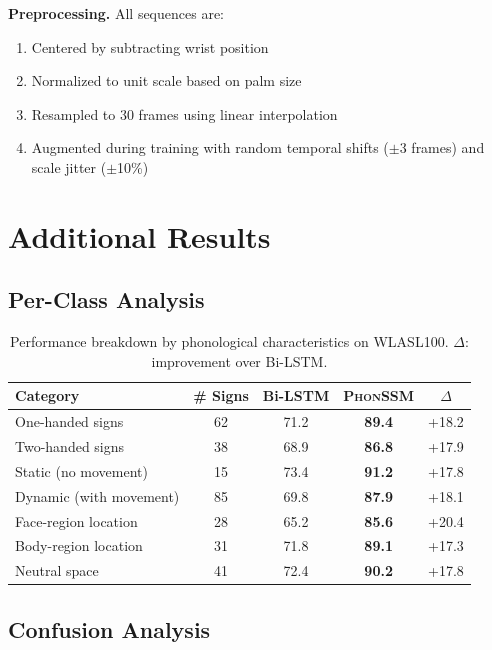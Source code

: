 \documentclass[sigconf,nonacm,anonymous]{acmart}
\theoremstyle{definition}
\theoremstyle{remark}
\newcommand{\phonssm}{\textsc{PhonSSM}}
\begin{document}
\textbf{Preprocessing.} All sequences are:
\begin{enumerate}[nosep,topsep=3pt,leftmargin=*]
\item Centered by subtracting wrist position
\item Normalized to unit scale based on palm size
\item Resampled to 30 frames using linear interpolation
\item Augmented during training with random temporal shifts ($\pm$3 frames) and scale jitter ($\pm$10\%)
\end{enumerate}

\section{Additional Results}

\subsection{Per-Class Analysis}

\begin{table}[ht]
\caption{Performance breakdown by phonological characteristics on WLASL100. $\Delta$: improvement over Bi-LSTM.}
\label{tab:perclass}
\begin{center}
\small
\begin{tabular}{lcccc}
\toprule
Category & \# Signs & Bi-LSTM & \phonssm{} & $\Delta$ \\
\midrule
One-handed signs & 62 & 71.2 & \textbf{89.4} & +18.2 \\
Two-handed signs & 38 & 68.9 & \textbf{86.8} & +17.9 \\
\midrule
Static (no movement) & 15 & 73.4 & \textbf{91.2} & +17.8 \\
Dynamic (with movement) & 85 & 69.8 & \textbf{87.9} & +18.1 \\
\midrule
Face-region location & 28 & 65.2 & \textbf{85.6} & +20.4 \\
Body-region location & 31 & 71.8 & \textbf{89.1} & +17.3 \\
Neutral space & 41 & 72.4 & \textbf{90.2} & +17.8 \\
\bottomrule
\end{tabular}
\end{center}
\end{table}

\subsection{Confusion Analysis}
\end{document}
